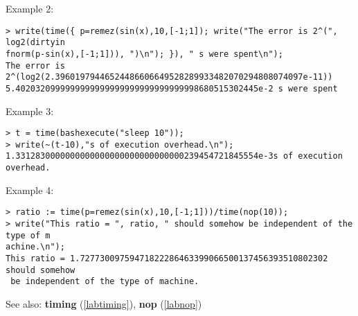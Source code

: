\noindent Example 2: 
\begin{center}\begin{minipage}{15cm}\begin{Verbatim}[frame=single]
> write(time({ p=remez(sin(x),10,[-1;1]); write("The error is 2^(", log2(dirtyin
fnorm(p-sin(x),[-1;1])), ")\n"); }), " s were spent\n");
The error is 2^(log2(2.39601979446524486606649528289933482070294808074097e-11))
5.4020320999999999999999999999999999998680515302445e-2 s were spent
\end{Verbatim}
\end{minipage}\end{center}
\noindent Example 3: 
\begin{center}\begin{minipage}{15cm}\begin{Verbatim}[frame=single]
> t = time(bashexecute("sleep 10"));
> write(~(t-10),"s of execution overhead.\n");
1.3312830000000000000000000000000000239454721845554e-3s of execution overhead.
\end{Verbatim}
\end{minipage}\end{center}
\noindent Example 4: 
\begin{center}\begin{minipage}{15cm}\begin{Verbatim}[frame=single]
> ratio := time(p=remez(sin(x),10,[-1;1]))/time(nop(10));
> write("This ratio = ", ratio, " should somehow be independent of the type of m
achine.\n");
This ratio = 1.72773009759471822286463399066500137456393510802302 should somehow
 be independent of the type of machine.
\end{Verbatim}
\end{minipage}\end{center}
See also: \textbf{timing} (\ref{labtiming}), \textbf{nop} (\ref{labnop})
